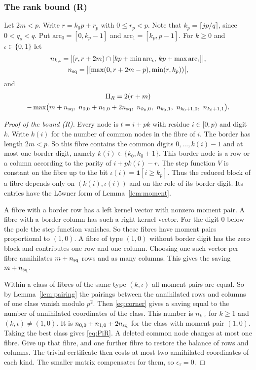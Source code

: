\documentclass[11pt]{amsart}
\theoremstyle{definition}
\theoremstyle{remark}
\numberwithin{equation}{section}
\begin{document}
\subsubsection{The rank bound (R)}\label{sssec:rank}
Let $2m<p$. Write $r=k_0p+r_p$ with $0\le r_p<p$. Note that $k_p=\lceil jp/q\rceil$, since $0<q_s<q$. Put
$\mathrm{arc}_0=[0,k_p-1]$ and $\mathrm{arc}_1=[k_p,p-1]$. For $k\ge0$ and $\iota\in\{0,1\}$ let
\[
\begin{gathered}
 n_{k,\iota}=\bigl|[r,r+2m)\cap[kp+\min\mathrm{arc}_\iota,\,kp+\max\mathrm{arc}_\iota]\bigr|,\\
 n_{\rm sq}=\bigl|[\max(0,r+2m-p),\min(r,k_p))\bigr|,
\end{gathered}
\]
and
\begin{multline}\label{eq:PiR}
 \Pi_R=2(r+m)\\-\max\bigl(m+n_{\rm sq},\ n_{0,0}+n_{1,0}+2n_{\rm sq},\ n_{k_0,0},\ n_{k_0,1},\ n_{k_0+1,0},\ n_{k_0+1,1}\bigr).
\end{multline}

\begin{proof}[Proof of the bound (R)]
Every node is $t=i+pk$ with residue $i\in[0,p)$ and digit $k$. Write $k(i)$ for the number of common nodes in the fibre
of $i$. The border has length $2m<p$. So this fibre contains the common digits $0,\dots,k(i)-1$ and at most one border
digit, namely $k(i)\in\{k_0,k_0+1\}$. This border node is a row or a column according to the parity of $i+pk(i)-r$. The
step function $V$ is constant on the fibre up to the bit $\iota(i)=\mathbf 1[i\ge k_p]$. Thus the reduced block of a fibre
depends only on $(k(i),\iota(i))$ and on the role of its border digit. Its entries have the L\"owner form of
Lemma~\ref{lem:moment}.

A fibre with a border row has a left kernel vector with nonzero moment pair. A fibre with a border column has such a
right kernel vector. For the digit $0$ below the pole the step function vanishes. So these fibres have moment pairs
proportional to $(1,0)$. A fibre of type $(1,0)$ without border digit has the zero block and contributes one row and one
column. Choosing one such vector per fibre annihilates $m+n_{\rm sq}$ rows and as many columns. This gives the saving
$m+n_{\rm sq}$.

Within a class of fibres of the same type $(k,\iota)$ all moment pairs are equal. So by Lemma~\ref{lem:pairing} the
pairings between the annihilated rows and columns of one class vanish modulo $p^2$. Then \eqref{eq:corner} gives a saving
equal to the number of annihilated coordinates of the class. This number is $n_{k,\iota}$ for $k\ge1$ and
$(k,\iota)\ne(1,0)$. It is $n_{0,0}+n_{1,0}+2n_{\rm sq}$ for the class with moment pair $(1,0)$. Taking the best class gives
\eqref{eq:PiR}. A deleted common node changes at most one fibre. Give up that fibre, and one further fibre to restore the
balance of rows and columns. The trivial certificate then costs at most two annihilated coordinates of each kind. The smaller
matrix compensates for them, so $\epsilon_\tau=0$.
\end{proof}
\end{document}
